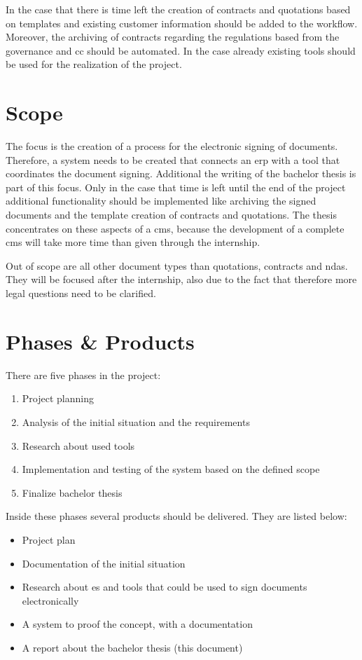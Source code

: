  In the case that there is time left the creation of contracts and quotations based on templates and existing customer information should be added to the workflow. Moreover, the archiving of contracts regarding the regulations based from the governance and \gls{cc} should be automated. In the case already existing tools should be used for the realization of the project.
 
 \section{Scope}
 The focus is the creation of a process for the electronic signing of documents. Therefore, a system needs to be created that connects an \gls{erp} with a tool that coordinates the document signing. Additional the writing of the bachelor thesis is part of this focus. Only in the case that time is left until the end of the project additional functionality should be implemented like archiving the signed documents and the template creation of contracts and quotations. The thesis concentrates on these aspects of a \gls{cms}, because the development of a complete \gls{cms} will take more time than given through the internship. 
 
 Out of scope are all other document types than quotations, contracts and \glspl{nda}. They will be focused after the internship, also due to the fact that therefore more legal questions need to be clarified. 
 
 \section{Phases \& Products} \label{sec:phases}
 There are five phases in the project:
 \begin{enumerate}
 	\item Project planning
 	\item Analysis of the initial situation and the requirements
 	\item Research about used tools 
 	\item Implementation and testing of the system based on the defined scope
 	\item Finalize bachelor thesis
 \end{enumerate}
 
 Inside these phases several products should be delivered. They are listed below:
 \begin{itemize}
 	\item Project plan
 	\item Documentation of the initial situation
 	\item Research about \gls{es} and tools that could be used to sign documents electronically
 	\item A system to proof the concept, with a documentation
 	\item A report about the bachelor thesis (this document)
 \end{itemize}
 
